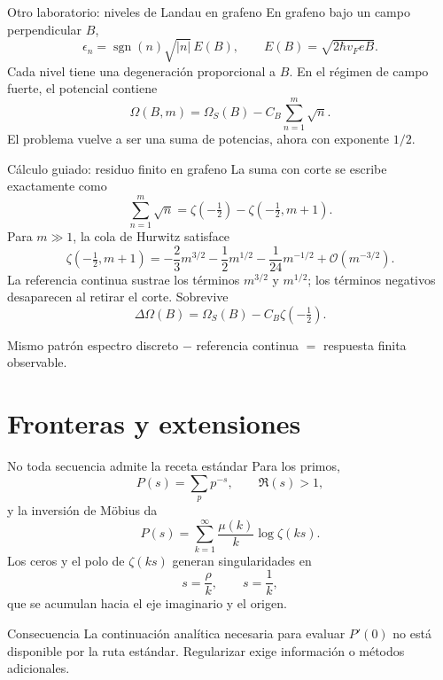 \documentclass[aspectratio=169,11pt]{beamer}
\begin{document}
\begin{frame}{Otro laboratorio: niveles de Landau en grafeno}
  En grafeno bajo un campo perpendicular $B$,
  \[
    \epsilon_n=\operatorname{sgn}(n)\sqrt{|n|}\,E(B),
    \qquad E(B)=\sqrt{2\hbar v_F eB}.
  \]
  \pause
  Cada nivel tiene una degeneración proporcional a $B$. En el régimen de campo fuerte,
  el potencial contiene
  \[
    \Omega(B,m)=\Omega_S(B)-C_B\sum_{n=1}^{m}\sqrt n.
  \]
  \pause
  El problema vuelve a ser una suma de potencias, ahora con exponente $1/2$.
\end{frame}

\begin{frame}{Cálculo guiado: residuo finito en grafeno}
  La suma con corte se escribe exactamente como
  \[
    \sum_{n=1}^{m}\sqrt n
      =\zeta\!\left(-\tfrac12\right)
       -\zeta\!\left(-\tfrac12,m+1\right).
  \]
  \pause
  Para $m\gg1$, la cola de Hurwitz satisface
  \[
    \zeta\!\left(-\tfrac12,m+1\right)
      =-\frac23m^{3/2}-\frac12m^{1/2}
       -\frac1{24}m^{-1/2}+\mathcal O(m^{-3/2}).
  \]
  \pause
  La referencia continua sustrae los términos $m^{3/2}$ y $m^{1/2}$; los términos
  negativos desaparecen al retirar el corte. Sobrevive
  \[
    \Delta\Omega(B)=\Omega_S(B)-C_B\zeta\!\left(-\tfrac12\right).
  \]
  \pause
  \begin{block}{Mismo patrón}
    espectro discreto $-$ referencia continua $=$ respuesta finita observable.
  \end{block}
\end{frame}

\section{Fronteras y extensiones}

\begin{frame}{No toda secuencia admite la receta estándar}
  Para los primos,
  \[
    P(s)=\sum_{p}p^{-s},\qquad \Re(s)>1,
  \]
  \pause
  y la inversión de Möbius da
  \[
    P(s)=\sum_{k=1}^{\infty}\frac{\mu(k)}{k}\log\zeta(ks).
  \]
  \pause
  Los ceros y el polo de $\zeta(ks)$ generan singularidades en
  \[
    s=\frac{\rho}{k},\qquad s=\frac1k,
  \]
  que se acumulan hacia el eje imaginario y el origen.
  \pause
  \begin{alertblock}{Consecuencia}
    La continuación analítica necesaria para evaluar $P'(0)$ no está disponible por
    la ruta estándar. Regularizar exige información o métodos adicionales.
  \end{alertblock}
\end{frame}
\end{document}
